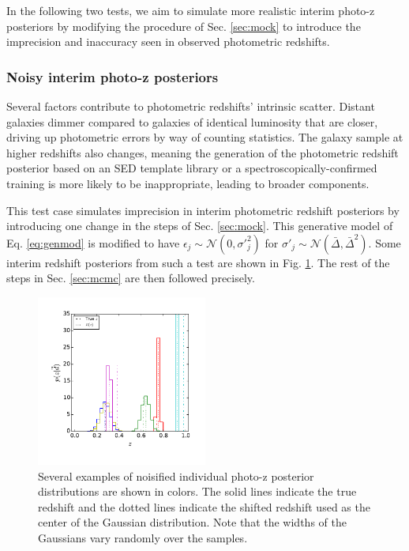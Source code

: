 \documentclass[preprint]{aastex}
\begin{document}
In the following two tests, we aim to simulate more realistic interim photo-z 
posteriors by modifying the procedure of Sec. \ref{sec:mock} to introduce the 
imprecision and inaccuracy seen in observed photometric redshifts.

\subsubsection{Noisy interim photo-z posteriors}
\label{sec:noisy}

Several factors contribute to photometric redshifts' intrinsic scatter.  
Distant galaxies dimmer compared to galaxies of identical luminosity that are 
closer, driving up photometric errors by way of counting statistics.  The 
galaxy sample at higher redshifts also changes, meaning the generation of the 
photometric redshift posterior based on an SED template library or a 
spectroscopically-confirmed training is more likely to be inappropriate, 
leading to broader components.

This test case simulates imprecision in interim photometric redshift posteriors 
by introducing one change in the steps of Sec. \ref{sec:mock}.  This generative 
model of Eq. \ref{eq:genmod} is modified to have 
$\epsilon_{j}\sim\mathcal{N}(0,\sigma'^{2}_{j})$ for 
$\sigma'_{j}\sim\mathcal{N}(\bar{\Delta},\bar{\Delta}^{2})$.  Some interim 
redshift posteriors from such a test are shown in Fig. \ref{fig:noisypzs}.  The 
rest of the steps in Sec. \ref{sec:mcmc} are then followed precisely.

\begin{figure}
\includegraphics[width=0.5\textwidth]{figs/vars/samplepzs.pdf}
\caption{Several examples of noisified individual photo-z posterior 
distributions are shown in colors.  The solid lines indicate the true redshift 
and the dotted lines indicate the shifted redshift used as the center of the 
Gaussian distribution.  Note that the widths of the Gaussians vary randomly 
over the samples.}
\label{fig:noisypzs}
\end{figure}
\end{document}
